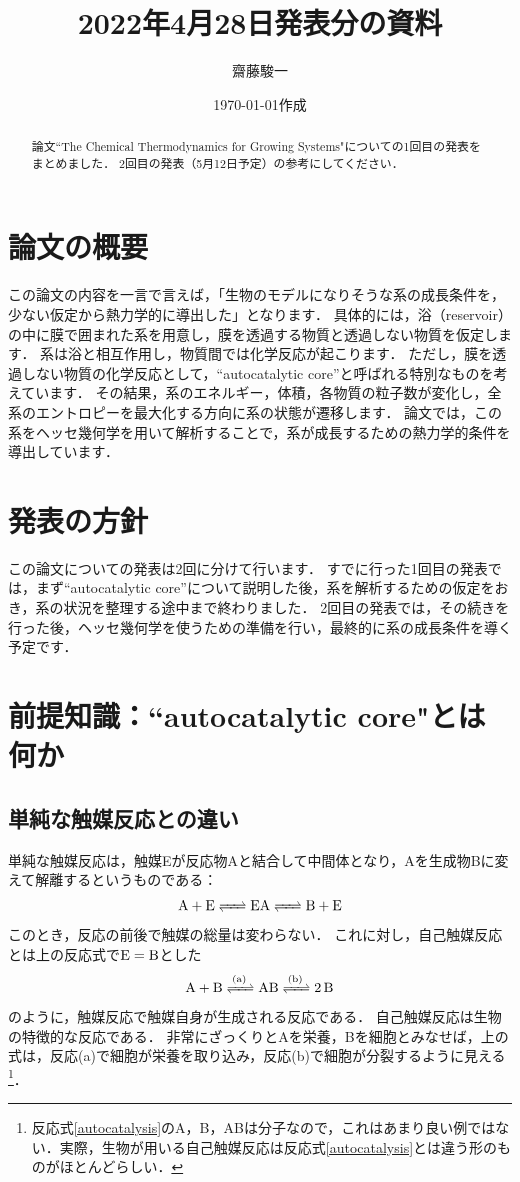 \documentclass[a4paper,11pt]{jsarticle}
\theoremstyle{definition}
\begin{document}
\title{2022年4月28日発表分の資料}
\author{齋藤駿一}
\date{\today 作成}
\maketitle

\begin{abstract}
  論文``The Chemical Thermodynamics for Growing Systems"についての1回目の発表をまとめました．
  2回目の発表（5月12日予定）の参考にしてください．
\end{abstract}

\tableofcontents

\section{論文の概要}
この論文の内容を一言で言えば，「生物のモデルになりそうな系の成長条件を，少ない仮定から熱力学的に導出した」となります．
具体的には，浴（reservoir）の中に膜で囲まれた系を用意し，膜を透過する物質と透過しない物質を仮定します．
系は浴と相互作用し，物質間では化学反応が起こります．
ただし，膜を透過しない物質の化学反応として，``autocatalytic core''と呼ばれる特別なものを考えています．
その結果，系のエネルギー，体積，各物質の粒子数が変化し，全系のエントロピーを最大化する方向に系の状態が遷移します．
論文では，この系をヘッセ幾何学を用いて解析することで，系が成長するための熱力学的条件を導出しています．

\section{発表の方針}
この論文についての発表は2回に分けて行います．
すでに行った1回目の発表では，まず``autocatalytic core''について説明した後，系を解析するための仮定をおき，系の状況を整理する途中まで終わりました．
2回目の発表では，その続きを行った後，ヘッセ幾何学を使うための準備を行い，最終的に系の成長条件を導く予定です．

\section{前提知識：``autocatalytic core"とは何か}
\subsection{単純な触媒反応との違い}
単純な触媒反応は，触媒Eが反応物Aと結合して中間体となり，Aを生成物Bに変えて解離するというものである：
\begin{equation}
  \ce{A + E <=> EA <=> B + E}
\end{equation}
このとき，反応の前後で触媒の総量は変わらない．
これに対し，自己触媒反応とは上の反応式で$\ce{E} = \ce{B}$とした
\begin{equation}
  \ce{A + B <=>[(a)] AB <=>[(b)] 2B} \label{autocatalysis}
\end{equation}
のように，触媒反応で触媒自身が生成される反応である．
自己触媒反応は生物の特徴的な反応である．
非常にざっくりとAを栄養，Bを細胞とみなせば，上の式は，反応(a)で細胞が栄養を取り込み，反応(b)で細胞が分裂するように見える\footnote{反応式\eqref{autocatalysis}のA，B，ABは分子なので，これはあまり良い例ではない．実際，生物が用いる自己触媒反応は反応式\eqref{autocatalysis}とは違う形のものがほとんどらしい．}．
\end{document}
